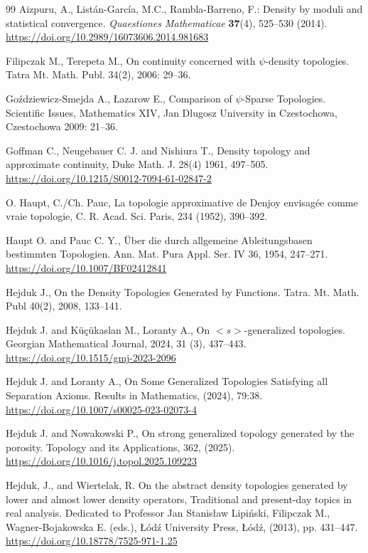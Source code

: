 \documentclass{amsart}
\theoremstyle{plain}
\numberwithin{equation}{section}
\begin{document}
\begin{thebibliography}{99}
Aizpuru, A., Listán-García, M.C., Rambla-Barreno, F.: Density by moduli and statistical convergence. \textit{Quaestiones Mathematicae} \textbf{37}(4), 525--530 (2014). \url{https://doi.org/10.2989/16073606.2014.981683}

Filipczak M., Terepeta M., On continuity concerned with $\psi$-density topologies. Tatra Mt. Math. Publ. 34(2), 2006: 29--36.

Goździewicz-Smejda A., Łazarow E., Comparison of $\psi$-Sparse Topologies. Scientific Issues, Mathematics XIV, Jan Dlugosz University in Czestochowa, Czestochowa 2009: 21--36.

Goffman C., Neugebauer C. J. and Nishiura T., Density topology and approximate continuity, Duke Math. J. 28(4) 1961, 497--505. \url{https://doi.org/10.1215/S0012-7094-61-02847-2}

O. Haupt, C./Ch. Pauc, La topologie approximative de Denjoy envisagée comme vraie topologie, C. R. Acad. Sci. Paris, 234 (1952), 390--392.

Haupt O. and Pauc C. Y., Über die durch allgemeine Ableitungsbasen bestimmten Topologien. Ann. Mat. Pura Appl. Ser. IV 36, 1954, 247--271. \url{https://doi.org/10.1007/BF02412841}

Hejduk J., On the Density Topologies Generated by Functions. Tatra. Mt. Math. Publ 40(2), 2008, 133--141.

Hejduk J. and K\"u\c{c}\"ukaslan M., Loranty A., On $<s>$-generalized topologies. Georgian Mathematical Journal, 2024, 31 (3), 437--443. \url{https://doi.org/10.1515/gmj-2023-2096}

Hejduk J. and Loranty A., On Some Generalized Topologies Satisfying all Separation Axioms. Results in Mathematics, (2024), 79:38. \url{https://doi.org/10.1007/s00025-023-02073-4}

Hejduk J. and  Nowakowski P., On strong generalized topology generated by the porosity.
Topology and its Applications, 362, (2025). \url{https://doi.org/10.1016/j.topol.2025.109223}

Hejduk, J., and Wiertelak, R. On the abstract density topologies generated by lower and almost lower density operators, Traditional and present-day topics in real analysis. Dedicated to Professor Jan Stanisław Lipiński, Filipczak M., Wagner-Bojakowska E. (eds.), Łódź University Press, Łódź, (2013), pp. 431--447. \url{https://doi.org/10.18778/7525-971-1.25}


\end{thebibliography}
\end{document}
